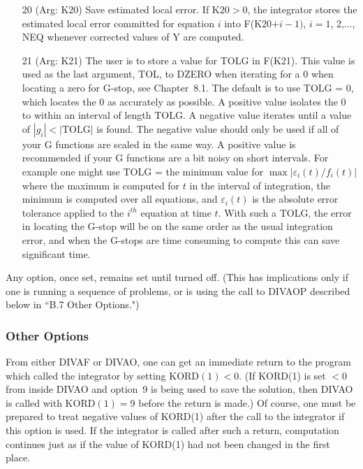 \documentclass[twoside]{MATH77}
\begin{document}
\begin{itemize}
\item[20]  (Arg: K20) Save estimated local error. If $\text{K20}>0$, the
integrator stores the estimated local error committed for equation $i$
into F(K20$+i-1)$, $i=1$, 2,..., NEQ whenever corrected values of Y are
computed.

\item[21] (Arg: K21) The user is to store a value for TOLG in F(K21).  This
  value is used as the last argument, TOL, to DZERO when iterating for a 0
  when locating a zero for G-stop, see Chapter~8.1.  The default is to use
  TOLG = 0, which locates the 0 as accurately as possible.  A positive value
  isolates the 0 to within an interval of length TOLG.  A negative value
  iterates until a value of $|g_i| < |\text{TOLG}|$ is found.  The negative
  value should only be used if all of your G functions are scaled in the same
  way.  A positive value is recommended if your G functions are a bit noisy on
  short intervals.  For example one might use TOLG = the minimum value for
  $\max |\varepsilon_i(t) / f_i(t)|$ where the maximum is computed for $t$
  in the interval of integration, the minimum is computed over all equations,
  and $\varepsilon_i(t)$ is the absolute error tolerance applied to the
  $i^{th}$ equation at time $t$.  With such a TOLG, the error in locating the
  G-stop will be on the same order as the usual integration error, and when
  the G-stops are time consuming to compute this can save significant time.
\end{itemize}

Any option, once set, remains set until turned off. (This has implications
only if one is running a sequence of problems, or is using the call to
DIVAOP described below in ``B.7 Other Options.")

\subsubsection{Other Options\label{OtherOpt}}

From either DIVAF or DIVAO, one can get an immediate return to the program
which called the integrator by setting KORD$(1)<0$. (If KORD(1) is set $<0$
from inside DIVAO and option~9 is being used to save the solution, then
DIVAO is called with KORD$(1)=9$ before the return is made.) Of course, one
must be prepared to treat negative values of KORD(1) after the call to the
integrator if this option is used. If the integrator is called after such a
return, computation continues just as if the value of KORD(1) had not been
changed in the first place.
\end{document}
